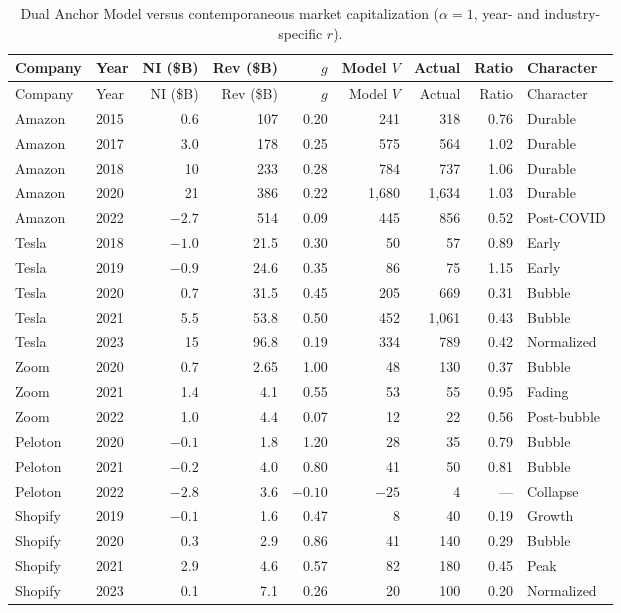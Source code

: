 \documentclass[11pt]{article}
\begin{document}
\begin{longtable}{@{}llrrrrrrl@{}}
\caption{Dual Anchor Model versus contemporaneous market capitalization (\(\alpha = 1\), year- and industry-specific \(r\)).}\\
\toprule
Company & Year & NI (\$B) & Rev (\$B) & \(g\) & Model \(V\) & Actual & Ratio & Character \\
\midrule
\endfirsthead
\toprule
Company & Year & NI (\$B) & Rev (\$B) & \(g\) & Model \(V\) & Actual & Ratio & Character \\
\midrule
\endhead
Amazon & 2015 & 0.6 & 107 & 0.20 & 241 & 318 & 0.76 & Durable \\
Amazon & 2017 & 3.0 & 178 & 0.25 & 575 & 564 & 1.02 & Durable \\
Amazon & 2018 & 10 & 233 & 0.28 & 784 & 737 & 1.06 & Durable \\
Amazon & 2020 & 21 & 386 & 0.22 & 1{,}680 & 1{,}634 & 1.03 & Durable \\
Amazon & 2022 & $-2.7$ & 514 & 0.09 & 445 & 856 & 0.52 & Post-COVID \\
Tesla & 2018 & $-1.0$ & 21.5 & 0.30 & 50 & 57 & 0.89 & Early \\
Tesla & 2019 & $-0.9$ & 24.6 & 0.35 & 86 & 75 & 1.15 & Early \\
Tesla & 2020 & 0.7 & 31.5 & 0.45 & 205 & 669 & 0.31 & Bubble \\
Tesla & 2021 & 5.5 & 53.8 & 0.50 & 452 & 1{,}061 & 0.43 & Bubble \\
Tesla & 2023 & 15 & 96.8 & 0.19 & 334 & 789 & 0.42 & Normalized \\
Zoom & 2020 & 0.7 & 2.65 & 1.00 & 48 & 130 & 0.37 & Bubble \\
Zoom & 2021 & 1.4 & 4.1 & 0.55 & 53 & 55 & 0.95 & Fading \\
Zoom & 2022 & 1.0 & 4.4 & 0.07 & 12 & 22 & 0.56 & Post-bubble \\
Peloton & 2020 & $-0.1$ & 1.8 & 1.20 & 28 & 35 & 0.79 & Bubble \\
Peloton & 2021 & $-0.2$ & 4.0 & 0.80 & 41 & 50 & 0.81 & Bubble \\
Peloton & 2022 & $-2.8$ & 3.6 & $-0.10$ & $-25$ & 4 & --- & Collapse \\
Shopify & 2019 & $-0.1$ & 1.6 & 0.47 & 8 & 40 & 0.19 & Growth \\
Shopify & 2020 & 0.3 & 2.9 & 0.86 & 41 & 140 & 0.29 & Bubble \\
Shopify & 2021 & 2.9 & 4.6 & 0.57 & 82 & 180 & 0.45 & Peak \\
Shopify & 2023 & 0.1 & 7.1 & 0.26 & 20 & 100 & 0.20 & Normalized \\

\end{longtable}
\end{document}

